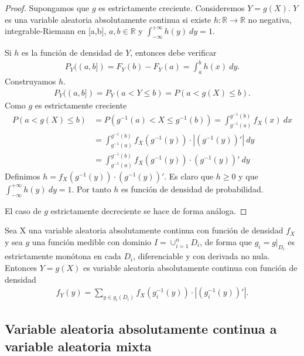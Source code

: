 \begin{proof}
    Supongamos que $g$ es estrictamente creciente. Consideremos $Y = g(X)$. $Y$ es una variable aleatoria absolutamente continua si existe $h: \mathbb{R} \longrightarrow \mathbb{R}$ no negativa, integrable-Riemann en [a,b], $a,b \in \mathbb{R}$ y $\int_{-\infty}^{+\infty}{h(y) \ dy} = 1$.

    Si $h$ es la función de densidad de $Y$, entonces debe verificar
    \begin{align*}
        P_Y((a,b]) = F_Y(b) - F_Y(a) = \int_{a}^{b}{h(x) \ dy}.
    \end{align*}
    Construyamos $h$.
    \begin{align*}
        P_Y((a,b]) = P_Y(a < Y \leq b) = P(a < g(X) \leq b).
    \end{align*}
    Como $g$ es estrictamente creciente
    \begin{align*}
        P(a < g(X) \leq b) & = P(g^{-1}(a) < X \leq g^{-1}(b)) = \int_{g^{-1}(a)}^{g^{-1}(b)}{f_X(x) \ dx} \\
                           & = \int_{g^{-1}(a)}^{g^{-1}(b)}{f_X(g^{-1}(y)) \cdot |(g^{-1}(y))'|\ dy}       \\
                           & = \int_{g^{-1}(a)}^{g^{-1}(b)}{f_X(g^{-1}(y)) \cdot (g^{-1}(y))'\ dy}
    \end{align*}
    Definimos $h = f_X(g^{-1}(y)) \cdot (g^{-1}(y))'$. Es claro que $h \ge 0$ y que $\int_{-\infty}^{+\infty}{h(y) \ dy} = 1$. Por tanto $h$ es función de densidad de probabilidad.

    El caso de $g$ estrictamente decreciente se hace de forma análoga.
\end{proof}

\begin{teo}
    Sea X una variable aleatoria absolutamente continua con función de densidad $f_X$ y sea $g$ una función medible con dominio $I = \cup_{i=1}^{n}{D_i}$, de forma que $g_i = g|_{D_i}$ es estrictamente monótona en cada $D_i$, diferenciable y con derivada no nula. Entonces $Y = g(X)$ es variable aleatoria absolutamente continua con función de densidad
    \begin{align*}
        f_Y(y) = \sum_{y \in g_i(D_i)}{f_X(g_i^{-1}(y)) \cdot |(g_i^{-1}(y))'|}.
    \end{align*}
\end{teo}

\subsection{Variable aleatoria absolutamente continua a variable aleatoria mixta}

